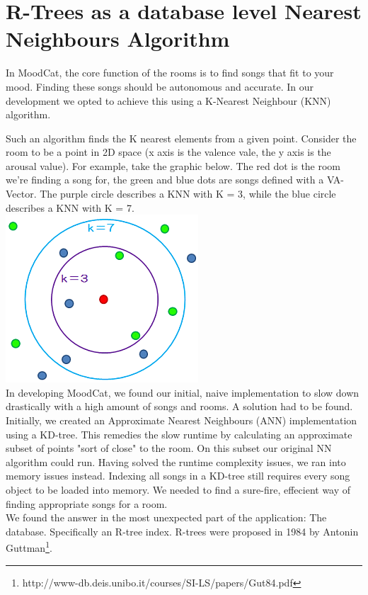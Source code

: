 \chapter{R-Trees as a database level Nearest Neighbours Algorithm}

In MoodCat, the core function of the rooms is to find songs that fit to your mood. Finding these songs should be autonomous and accurate. In our development we opted to achieve this using a K-Nearest Neighbour (KNN) algorithm.

Such an algorithm finds the K nearest elements from a given point. Consider the room to be a point in 2D space (x axis is the valence vale, the y axis is the arousal value). For example, take the graphic below. The red dot is the room we're finding a song for, the green and blue dots are songs defined with a VA-Vector. The purple circle describes a KNN with K = 3, while the blue circle describes a KNN with K = 7. \\
\includegraphics[scale=0.6]{knearestneighboursexample.png}\\

In developing MoodCat, we found our initial, naive implementation to slow down drastically with a high amount of songs and rooms. A solution had to be found. Initially, we created an Approximate Nearest Neighbours (ANN) implementation using a KD-tree. This remedies the slow runtime by calculating an approximate subset of points "sort of close" to the room. On this subset our original NN algorithm could run. Having solved the runtime complexity issues, we ran into memory issues instead. Indexing all songs in a KD-tree still requires every song object to be loaded into memory. We needed to find a sure-fire, effecient way of finding appropriate songs for a room.\\

We found the answer in the most unexpected part of the application: The database. Specifically an R-tree index. R-trees were proposed in 1984 by Antonin Guttman\footnote{http://www-db.deis.unibo.it/courses/SI-LS/papers/Gut84.pdf}. 